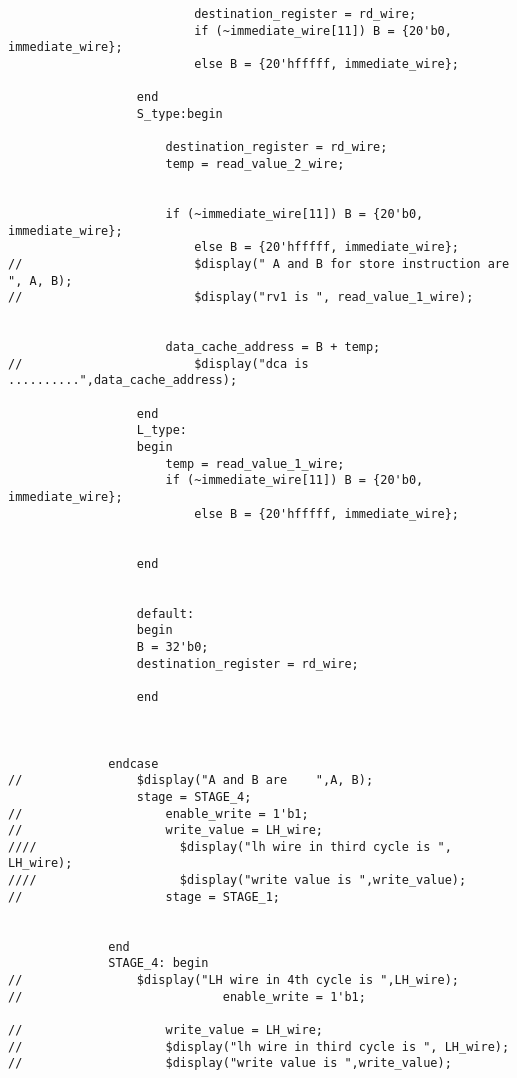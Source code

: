 \begin{lstlisting}
                          destination_register = rd_wire;
                          if (~immediate_wire[11]) B = {20'b0, immediate_wire};
                          else B = {20'hfffff, immediate_wire};
                          
                  end
                  S_type:begin
                  
                      destination_register = rd_wire;
                      temp = read_value_2_wire;
                      
                      
                      if (~immediate_wire[11]) B = {20'b0, immediate_wire};
                          else B = {20'hfffff, immediate_wire};
//                        $display(" A and B for store instruction are ", A, B);
//                        $display("rv1 is ", read_value_1_wire);
                      
                      
                      data_cache_address = B + temp;
//                        $display("dca is ..........",data_cache_address);
                  
                  end
                  L_type:
                  begin
                      temp = read_value_1_wire;
                      if (~immediate_wire[11]) B = {20'b0, immediate_wire};
                          else B = {20'hfffff, immediate_wire};
                      
                  
                  end
                  
                  
                  default: 
                  begin
                  B = 32'b0;
                  destination_register = rd_wire;
                  
                  end
                  
                  
                  
              endcase
//                $display("A and B are    ",A, B);
                  stage = STAGE_4;
//                    enable_write = 1'b1;
//                    write_value = LH_wire;
////                    $display("lh wire in third cycle is ", LH_wire);
////                    $display("write value is ",write_value);
//                    stage = STAGE_1;
              
              
              end
              STAGE_4: begin
//                $display("LH wire in 4th cycle is ",LH_wire);
//                            enable_write = 1'b1;

//                    write_value = LH_wire;
//                    $display("lh wire in third cycle is ", LH_wire);
//                    $display("write value is ",write_value);
                  

\end{lstlisting}
